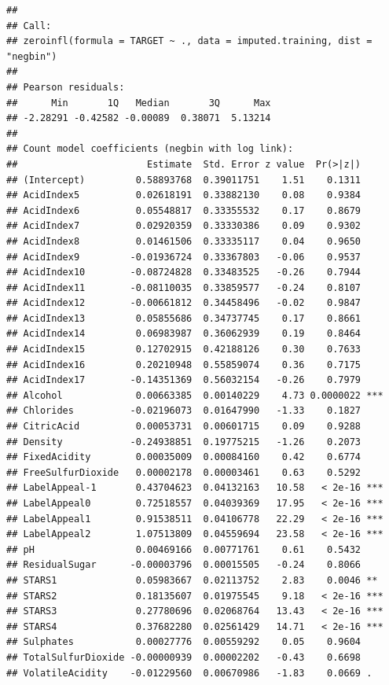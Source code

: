 \documentclass[]{article}
\begin{document}
\begin{verbatim}
## 
## Call:
## zeroinfl(formula = TARGET ~ ., data = imputed.training, dist = "negbin")
## 
## Pearson residuals:
##      Min       1Q   Median       3Q      Max 
## -2.28291 -0.42582 -0.00089  0.38071  5.13214 
## 
## Count model coefficients (negbin with log link):
##                       Estimate  Std. Error z value  Pr(>|z|)    
## (Intercept)         0.58893768  0.39011751    1.51    0.1311    
## AcidIndex5          0.02618191  0.33882130    0.08    0.9384    
## AcidIndex6          0.05548817  0.33355532    0.17    0.8679    
## AcidIndex7          0.02920359  0.33330386    0.09    0.9302    
## AcidIndex8          0.01461506  0.33335117    0.04    0.9650    
## AcidIndex9         -0.01936724  0.33367803   -0.06    0.9537    
## AcidIndex10        -0.08724828  0.33483525   -0.26    0.7944    
## AcidIndex11        -0.08110035  0.33859577   -0.24    0.8107    
## AcidIndex12        -0.00661812  0.34458496   -0.02    0.9847    
## AcidIndex13         0.05855686  0.34737745    0.17    0.8661    
## AcidIndex14         0.06983987  0.36062939    0.19    0.8464    
## AcidIndex15         0.12702915  0.42188126    0.30    0.7633    
## AcidIndex16         0.20210948  0.55859074    0.36    0.7175    
## AcidIndex17        -0.14351369  0.56032154   -0.26    0.7979    
## Alcohol             0.00663385  0.00140229    4.73 0.0000022 ***
## Chlorides          -0.02196073  0.01647990   -1.33    0.1827    
## CitricAcid          0.00053731  0.00601715    0.09    0.9288    
## Density            -0.24938851  0.19775215   -1.26    0.2073    
## FixedAcidity        0.00035009  0.00084160    0.42    0.6774    
## FreeSulfurDioxide   0.00002178  0.00003461    0.63    0.5292    
## LabelAppeal-1       0.43704623  0.04132163   10.58   < 2e-16 ***
## LabelAppeal0        0.72518557  0.04039369   17.95   < 2e-16 ***
## LabelAppeal1        0.91538511  0.04106778   22.29   < 2e-16 ***
## LabelAppeal2        1.07513809  0.04559694   23.58   < 2e-16 ***
## pH                  0.00469166  0.00771761    0.61    0.5432    
## ResidualSugar      -0.00003796  0.00015505   -0.24    0.8066    
## STARS1              0.05983667  0.02113752    2.83    0.0046 ** 
## STARS2              0.18135607  0.01975545    9.18   < 2e-16 ***
## STARS3              0.27780696  0.02068764   13.43   < 2e-16 ***
## STARS4              0.37682280  0.02561429   14.71   < 2e-16 ***
## Sulphates           0.00027776  0.00559292    0.05    0.9604    
## TotalSulfurDioxide -0.00000939  0.00002202   -0.43    0.6698    
## VolatileAcidity    -0.01229560  0.00670986   -1.83    0.0669 .  

\end{verbatim}
\end{document}
